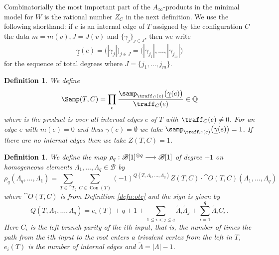 \documentclass[english,letter paper,12pt,leqno]{article}
\theoremstyle{example}
\newtheorem{definition}[theorem]{Definition}
\numberwithin{equation}{section}
\def\be{\begin{equation}}
\def\ee{\end{equation}}
\begin{document}
Combinatorially the most important part of the $A_\infty$-products in the minimal model for $W$ is the rational number $Z_C$ in the next definition. We use the following shorthand: if $e$ is an internal edge of $T$ assigned by the configuration $C$ the data $m = m(v), J = J(v)$ and $\{ \gamma_j \}_{j \in J}$, then we write
\be
\underline{\gamma}(e) = \big( |\gamma_j| \big)_{j \in J} = \big( |\gamma_{j_1}|, \ldots, |\gamma_{j_m}| \big)
\ee
for the sequence of total degrees where $J = \{j_1,\ldots,j_m\}$. 

\begin{definition} We define
\begin{gather*}
\Samp(T,C) = \prod_{e} \frac{ \samp_{\traff_C(e)}\big( \underline{\gamma}(e) \big)}{ \traff_C(e) } \in \mathbb{Q}
\end{gather*}
where is the product is over all internal edges $e$ of $T$ with $\traff_C(e) \neq 0$. For an edge $e$ with $m(e) = 0$ and thus $\underline{\gamma}(e) = \emptyset$ we take $\samp_{\traff_C(e)}\big( \underline{\gamma}(e) \big) = 1$. If there are no internal edges then we take $Z(T,C) = 1$.
\end{definition}

\begin{definition}\label{defn:bainf} We define the map $\rho_q: \mathscr{B}[1]^{\otimes q} \longrightarrow \mathscr{B}[1]$ of degree $+1$ on homogeneous elements $\Lambda_1,\ldots,\Lambda_q \in \mathscr{B}$ by
\[
\rho_q( \Lambda_q, \ldots, \Lambda_1 ) = \sum_{T \in \cat{T}_q} \sum_{C \in \operatorname{Con}(T)} (-1)^{Q(T, \Lambda_1, \ldots, \Lambda_q)} Z(T,C) \cdot \cat{O}(T, C)( \Lambda_1, \ldots, \Lambda_q )
\]
where $\cat{O}(T,C)$ is from Definition \ref{defn:otc} and the sign is given by
\be\label{eq:defnQsign}
Q(T, \Lambda_1, \ldots, \Lambda_q) = e_i(T) + q + 1 + \sum_{1 \le i < j \le q} \widetilde{\Lambda}_i \widetilde{\Lambda}_j + \sum_{i=1}^q \widetilde{\Lambda}_i C_i\,.
\ee
Here $C_i$ is the \emph{left branch parity} of the $i$th input, that is, the number of times the path from the $i$th input to the root enters a trivalent vertex from the left in $T$, $e_i(T)$ is the number of internal edges and $\widetilde{\Lambda} = |\Lambda| - 1$.
\end{definition}
\end{document}
